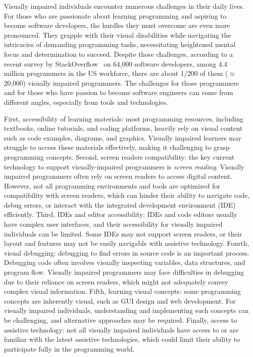 


Visually impaired individuals encounter numerous challenges in their
daily lives. For those who are passionate about learning programming
and aspiring to become software developers, the hurdles they must
overcome are even more pronounced. They grapple with their visual
disabilities while navigating the intricacies of demanding programming
tasks, necessitating heightened mental focus and determination to
succeed. Despite those challenges, according to a recent survey by
StackOverflow~\cite{blind-code} on 64,000 software developers, among 4.4
million programmers in the US workforce, there are about 1/200 of them
($\approx$ 20,000) visually impaired programmers. The challenges for
those programmers and for those who have passion to become software
engineers can come from different angles, especially from tools
and technologies.

First, accessibility of learning materials: most programming
resources, including textbooks, online tutorials, and coding
platforms, heavily rely on visual content such as code examples,
diagrams, and graphics. Visually impaired learners may struggle to
access these materials effectively, making it challenging to grasp
programming concepts. Second, screen readers compatibility: the key
current technology to support visually-impaired programmers is {\em
screen reading}. Visually impaired programmers often rely on screen
readers to access digital content. However, not all programming
environments and tools are optimized for compatibility with screen
readers, which can hinder their ability to navigate code, debug
errors, or interact with the integrated development environment (IDE)
efficiently.  Third, IDEs and editor accessibility: IDEs and code
editors usually have complex user interfaces, and their accessibility
for visually impaired individuals can be limited. Some IDEs may not
support screen readers, or their layout and features may not be easily
navigable with assistive technology. Fourth, visual debugging:
debugging to find errors in source code is an important
process. Debugging code often involves visually inspecting variables,
data structures, and program flow. Visually impaired programmers may
face difficulties in debugging due to their reliance on screen
readers, which might not adequately convey complex visual
information. Fifth, learning visual concepts: some programming
concepts are inherently visual, such as GUI design and web
development. For visually impaired individuals, understanding and
implementing such concepts can be challenging, and alternative
approaches may be required. Finally, access to assistive technology:
not all visually impaired individuals have access to or are familiar
with the latest assistive technologies, which could limit their
ability to participate fully in the programming world.

